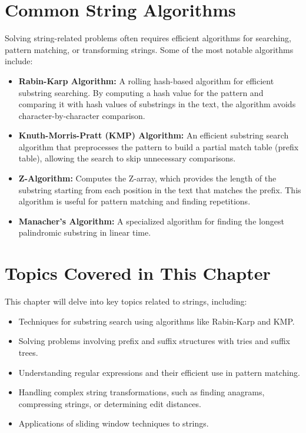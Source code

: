 \section*{Common String Algorithms}
Solving string-related problems often requires efficient algorithms for searching, pattern matching, or transforming strings. Some of the most notable algorithms include:

\begin{itemize}
    \item \textbf{Rabin-Karp Algorithm:}  
    A rolling hash-based algorithm for efficient substring searching. By computing a hash value for the pattern and comparing it with hash values of substrings in the text, the algorithm avoids character-by-character comparison.
    
    \item \textbf{Knuth-Morris-Pratt (KMP) Algorithm:}  
    An efficient substring search algorithm that preprocesses the pattern to build a partial match table (prefix table), allowing the search to skip unnecessary comparisons.
    
    \item \textbf{Z-Algorithm:}  
    Computes the Z-array, which provides the length of the substring starting from each position in the text that matches the prefix. This algorithm is useful for pattern matching and finding repetitions.
    
    \item \textbf{Manacher's Algorithm:}  
    A specialized algorithm for finding the longest palindromic substring in linear time.
\end{itemize}

\section*{Topics Covered in This Chapter}
This chapter will delve into key topics related to strings, including:
\begin{itemize}
    \item Techniques for substring search using algorithms like Rabin-Karp and KMP.
    \item Solving problems involving prefix and suffix structures with tries and suffix trees.
    \item Understanding regular expressions and their efficient use in pattern matching.
    \item Handling complex string transformations, such as finding anagrams, compressing strings, or determining edit distances.
    \item Applications of sliding window techniques to strings.
\end{itemize}


